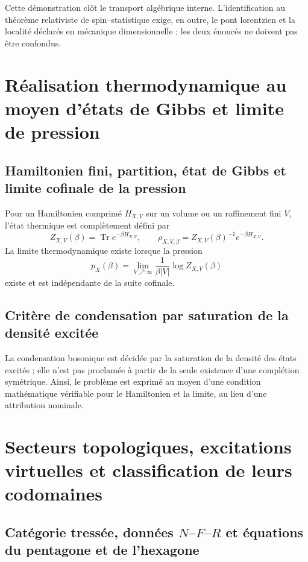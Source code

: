 Cette démonstration clôt le transport algébrique interne. L'identification
au théorème relativiste de spin--statistique exige, en outre, le pont
lorentzien et la localité déclarés en mécanique dimensionnelle ; les deux énoncés
ne doivent pas être confondus.

\section{Réalisation thermodynamique au moyen d’états de Gibbs et limite de pression}

\subsection{Hamiltonien fini, partition, état de Gibbs et limite cofinale de la pression}

Pour un Hamiltonien comprimé \(H_{X,V}\) sur un volume ou un raffinement
fini \(V\), l’état thermique est complètement défini par
\[
 Z_{X,V}(\beta)=\operatorname{Tr}e^{-\beta H_{X,V}},
 \qquad
 \rho_{X,V,\beta}=Z_{X,V}(\beta)^{-1}e^{-\beta H_{X,V}}.
\]
La limite thermodynamique existe lorsque la pression
\[
 p_X(\beta)=\lim_{V\nearrow\infty}
 \frac1{\beta |V|}\log Z_{X,V}(\beta)
\]
existe et est indépendante de la suite cofinale.

\subsection{Critère de condensation par saturation de la densité excitée}

La condensation bosonique est
décidée par la saturation de la densité des états excités ; elle n’est pas proclamée à
partir de la seule existence d’une complétion symétrique. Ainsi, le problème
est exprimé au moyen d’une condition mathématique vérifiable pour le
Hamiltonien et la limite, au lieu d’une attribution nominale.

\section{Secteurs topologiques, excitations virtuelles et classification de leurs codomaines}

\subsection{Catégorie tressée, données \texorpdfstring{\(N\)--\(F\)--\(R\)}{N--F--R} et équations du pentagone et de l'hexagone}

